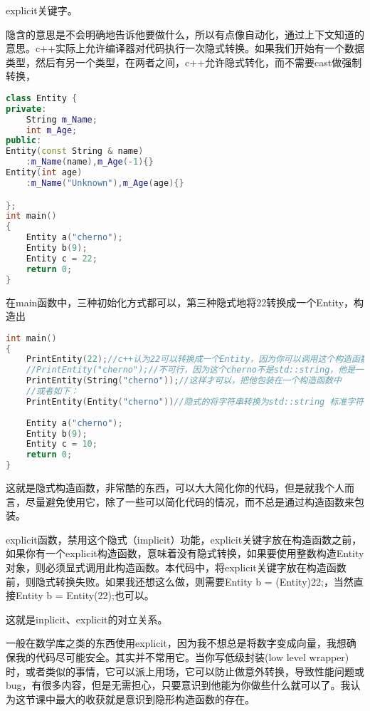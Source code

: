 {\ncodestyle explicit}关键字。

隐含的意思是不会明确地告诉他要做什么，所以有点像自动化，通过上下文知道的意思。c++实际上允许编译器对代码执行一次隐式转换。如果我们开始有一个数据类型，然后有另一个类型，在两者之间，c++允许隐式转化，而不需要{\ncodestyle cast}做强制转换，


\begin{lstlisting}[language=c++]
class Entity {
private:
    String m_Name;
    int m_Age;
public:
Entity(const String & name)
    :m_Name(name),m_Age(-1){}
Entity(int age)
    :m_Name("Unknown"),m_Age(age){}

};
int main()
{
    Entity a("cherno");
    Entity b(9);
    Entity c = 22;
    return 0;
}
\end{lstlisting}

在{\ncodestyle main}函数中，三种初始化方式都可以，第三种隐式地将22转换成一个Entity，构造出


\begin{lstlisting}[language=c++]
int main()
{
    PrintEntity(22);//c++认为22可以转换成一个Entity，因为你可以调用这个构造函数，22是你创建Entity的唯一参数
    //PrintEntity("cherno");//不可行，因为这个cherno不是std::string，他是一个char类型数组，为了让其工作，c++需要两步工作，一个是从const char数组到string吗，一个是从string到Entity，但它只允许做一次隐式转换
    PrintEntity(String("cherno"));//这样才可以，把他包装在一个构造函数中
    //或者如下：
    PrintEntity(Entity("cherno"))//隐式的将字符串转换为std::string 标准字符串，然后被推进Entity构造函数
    
    Entity a("cherno");
    Entity b(9);
    Entity c = 10;
    return 0;
}
\end{lstlisting}


这就是隐式构造函数，非常酷的东西，可以大大简化你的代码，但是就我个人而言，尽量避免使用它，除了一些可以简化代码的情况，而不总是通过构造函数来包装。

{\ncodestyle explicit}函数，禁用这个隐式（implicit）功能，{\ncodestyle explicit}关键字放在构造函数之前，如果你有一个{\ncodestyle explicit}构造函数，意味着没有隐式转换，如果要使用整数构造{\ncodestyle Entity}对象，则必须显式调用此构造函数。本代码中，将{\ncodestyle explicit}关键字放在构造函数前，则隐式转换失败。如果我还想这么做，则需要{\ncodestyle Entity b = (Entity)22;}，当然直接{\ncodestyle Entity b = Entity(22);}也可以。

这就是{\ncodestyle inplicit}、{\ncodestyle explicit}的对立关系。

一般在数学库之类的东西使用{\ncodestyle explicit}，因为我不想总是将数字变成向量，我想确保我的代码尽可能安全。其实并不常用它。当你写低级封装(low level wrapper)时，或者类似的事情，它可以派上用场，它可以防止做意外转换，导致性能问题或bug，有很多内容，但是无需担心，只要意识到他能为你做些什么就可以了。我认为这节课中最大的收获就是意识到隐形构造函数的存在。

